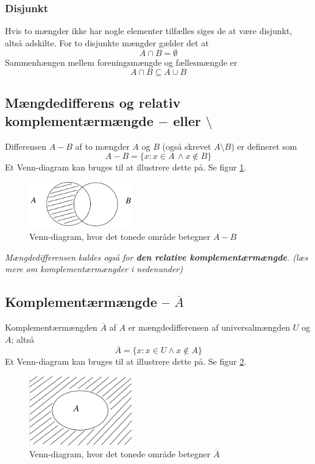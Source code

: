 \subsubsection{Disjunkt}
Hvis to mængder ikke har nogle elementer tilfælles siges de at være disjunkt, altså adskilte. For to disjunkte mængder gælder det at \[A\cap B = \emptyset\]
Sammenhængen mellem foreningsmængde og fællesmængde er\[A\cap B\subseteq A\cup B\]
\subsection{Mængdedifferens og relativ komplementærmængde \texorpdfstring{$-$ eller $\setminus$}{}}
Differensen $A-B$ af to mængder $A$ og $B$ (også skrevet $A\setminus B$) er defineret som\[ A-B=\{x:x\in A\,\land x\notin B\}\]Et Venn-diagram kan bruges til at illustrere dette på. Se figur \ref{fig:differensvenn}.
\begin{figure}[H]
    \centering
    \includegraphics[width=0.4\textwidth]{billeder/Acrobat_mR0KSCJDtQ.png}
    \caption{Venn-diagram, hvor det tonede område betegner $A-B$}
    \label{fig:differensvenn}
\end{figure}
\textit{Mængdedifferensen kaldes også for \textbf{den relative komplementærmængde}. (læs mere om komplementærmængder i nedenunder)}
\subsection{Komplementærmængde\texorpdfstring{ -- $\overline{A}$}{}}
Komplementærmængden $\overline{A}$ af $A$ er mængdedifferensen af universalmængden $U$ og $A$; altså\[\overline{A}=\{x:x\in U \land x\notin A\}\]Et Venn-diagram kan bruges til at illustrere dette på. Se figur \ref{fig:complementvenn}.
\begin{figure}[H]
    \centering
    \includegraphics[width=0.4\textwidth]{billeder/Acrobat_p0XoSIqOY7.png}
    \caption{Venn-diagram, hvor det tonede område betegner $\overline{A}$}
    \label{fig:complementvenn}
\end{figure}
